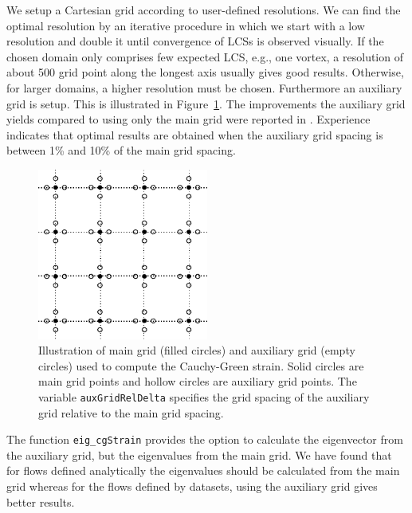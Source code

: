 \documentclass{article}
\begin{document}
We setup a Cartesian grid according to user-defined resolutions. We can find the optimal resolution by an iterative procedure in which we start with a low resolution and double it until convergence of LCSs is observed visually. 
If the chosen domain only comprises few expected LCS, e.g., one vortex, a resolution of about 500 grid point along the longest axis usually gives good results. Otherwise, for larger domains, a higher resolution must be chosen. Furthermore an auxiliary grid is setup. This is illustrated in Figure~\ref{f:main and auxiliary grids}. The improvements the auxiliary grid yields compared to using only the main grid were reported in \textcite{farazmand12:_comput_lagran}. Experience indicates that optimal results are obtained when the auxiliary grid spacing is between 1\% and 10\% of the main grid spacing.

\begin{figure}
\begin{center}
\includegraphics[width=0.5\textwidth]{graphics/main_aux_grids}
\end{center}
\caption{Illustration of main grid (filled circles) and auxiliary grid (empty circles) used to compute the Cauchy-Green strain. Solid circles are main grid points and hollow circles are auxiliary grid points. The variable \lstinline!auxGridRelDelta! specifies the grid spacing of the auxiliary grid relative to the main grid spacing.}
\label{f:main and auxiliary grids}
\end{figure}

The function \lstinline!eig_cgStrain! provides the option to calculate the eigenvector from the auxiliary grid, but the eigenvalues from the main grid. We have found that for flows defined analytically the eigenvalues should be calculated from the main grid whereas for the flows defined by datasets, using the auxiliary grid gives better results.
\end{document}
